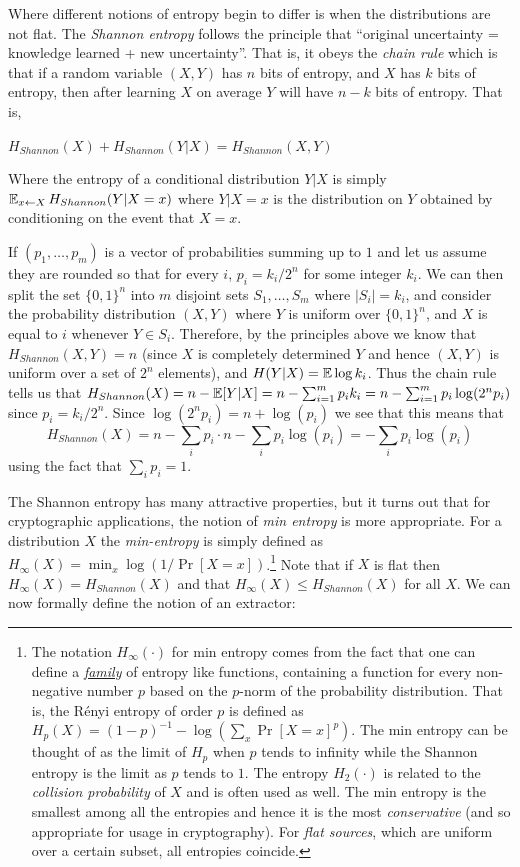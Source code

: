 Where different notions of entropy begin to differ is when the
distributions are not flat. The \emph{Shannon entropy} follows the
principle that ``original uncertainty = knowledge learned + new
uncertainty''. That is, it obeys the \emph{chain rule} which is that if
a random variable \((X,Y)\) has \(n\) bits of entropy, and \(X\) has
\(k\) bits of entropy, then after learning \(X\) on average \(Y\) will
have \(n-k\) bits of entropy. That is,

\(H_{Shannon}(X)+H_{Shannon}(Y|X) = H_{Shannon}(X,Y)\)

Where the entropy of a conditional distribution \(Y|X\) is simply
\(\operatorname*{\mathbb E}_{x\leftarrow X} H_{Shannon}(Y|X=x)\) where \(Y|X=x\) is the
distribution on \(Y\) obtained by conditioning on the event that
\(X=x\).

If \((p_1,\ldots,p_m)\) is a vector of probabilities summing up to \(1\)
and let us assume they are rounded so that for every \(i\),
\(p_i = k_i/2^n\) for some integer \(k_i\). We can then split the set
\(\{0,1\}^n\) into \(m\) disjoint sets \(S_1,\ldots,S_m\) where
\(|S_i|=k_i\), and consider the probability distribution \((X,Y)\) where
\(Y\) is uniform over \(\{0,1\}^n\), and \(X\) is equal to \(i\)
whenever \(Y\in S_i\). Therefore, by the principles above we know that
\(H_{Shannon}(X,Y)=n\) (since \(X\) is completely determined \(Y\) and
hence \((X,Y)\) is uniform over a set of \(2^n\) elements), and
\(H(Y|X)= \operatorname*{\mathbb E} \log k_i\). Thus the chain rule tells us that
\(H_{Shannon}(X) = n - \operatorname*{\mathbb E}[Y|X] = n - \sum_{i=1}^m p_i k_i = n - \sum_{i=1}^m p_i \log(2^n p_i)\)
since \(p_i = k_i/2^n\). Since \(\log(2^n p_i) = n + \log(p_i)\) we see
that this means that
\begin{equation*}
H_{Shannon}(X) =  n - \sum_i p_i \cdot n - \sum_i p_i \log(p_i) = - \sum_i p_i \log (p_i)
\end{equation*}
using the fact that \(\sum_i p_i = 1\).

The Shannon entropy has many attractive properties, but it turns out
that for cryptographic applications, the notion of \emph{min entropy} is
more appropriate. For a distribution \(X\) the \emph{min-entropy} is
simply defined as \(H_{\infty}(X)= \min_x \log(1/\Pr[X=x])\).\footnote{The
  notation \(H_{\infty}(\cdot)\) for min entropy comes from the fact
  that one can define a \href{https://goo.gl/HvVgu1}{\emph{family}} of
  entropy like functions, containing a function for every non-negative
  number \(p\) based on the \(p\)-norm of the probability distribution.
  That is, the Rényi entropy of order \(p\) is defined as
  \(H_p(X)=(1-p)^{-1}-\log(\sum_x \Pr[X=x]^p)\). The min entropy can be
  thought of as the limit of \(H_p\) when \(p\) tends to infinity while
  the Shannon entropy is the limit as \(p\) tends to \(1\). The entropy
  \(H_2(\cdot)\) is related to the \emph{collision probability} of \(X\)
  and is often used as well. The min entropy is the smallest among all
  the entropies and hence it is the most \emph{conservative} (and so
  appropriate for usage in cryptography). For \emph{flat sources}, which
  are uniform over a certain subset, all entropies coincide.} Note that
if \(X\) is flat then \(H_{\infty}(X)=H_{Shannon}(X)\) and that
\(H_{\infty}(X) \leq H_{Shannon}(X)\) for all \(X\). We can now formally
define the notion of an extractor:

